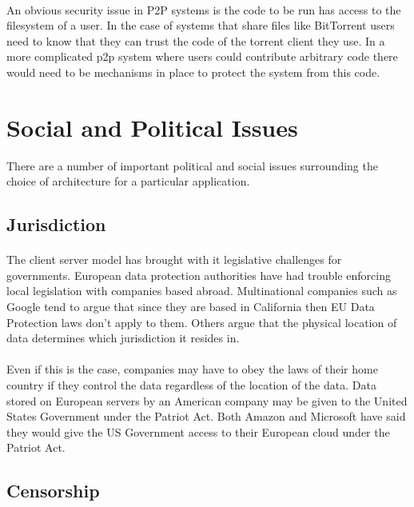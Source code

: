 \documentclass[11pt]{amsart}
\begin{document}
\paragraph{}
An obvious security issue in P2P systems is the code to be run has access to the filesystem of a user. In the case of systems that share files like BitTorrent users need to know that they can trust the code of the torrent client they use. In a more complicated p2p system where users could contribute arbitrary code there would need to be mechanisms in place to protect the system from this code.

\section{Social and Political Issues}

There are a number of important political and social issues surrounding the choice of architecture for a particular application.

\subsection{Jurisdiction}
\paragraph{}
The client server model has brought with it legislative challenges for governments. European data protection authorities have had trouble enforcing local legislation with companies based abroad. Multinational companies such as Google tend to argue that since they are based in California then EU Data Protection laws don't apply to them. Others argue that the physical location of data determines which jurisdiction it resides in. 
\paragraph{}
Even if this is the case, companies may have to obey the laws of their home country if they control the data regardless of the location of the data. Data stored on European servers by an American company may be given to the United States Government under the Patriot Act. Both Amazon and Microsoft have said they would give the US Government access to their European cloud under the Patriot Act.\cite{Forbes}

\subsection{Censorship}
\end{document}
